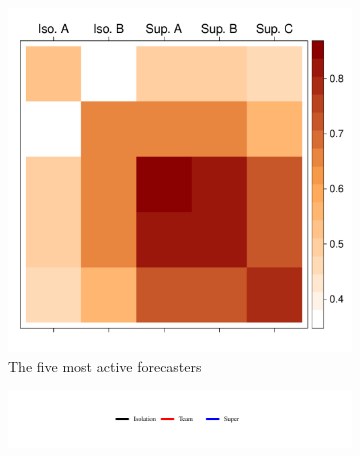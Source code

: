 \documentclass[11pt]{article}
\theoremstyle{definition}
\theoremstyle{definition}
\begin{document}
\begin{figure}[t!]
        \centering
        \begin{subfigure}[b]{0.495\textwidth}
                \includegraphics[width=\textwidth]{leftInfoPlot.pdf}
                \caption{The five most active forecasters}
                \label{top5}
        \end{subfigure}%
        \begin{subfigure}[b]{0.495\textwidth}
        \hspace*{-11em} 	\includegraphics{legendSigmaAll.pdf} %
\vspace{-4.5em}


\end{subfigure}
\end{figure}
\end{document}
